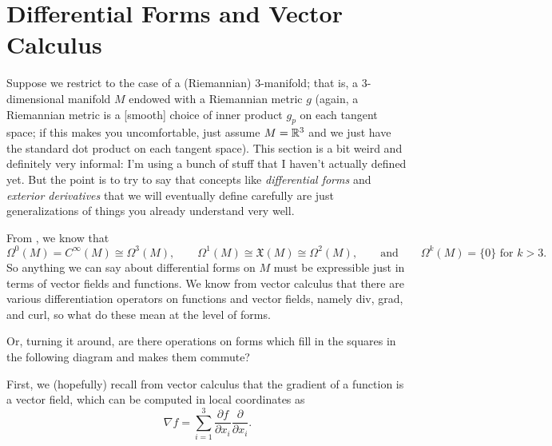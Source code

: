 
\section{Differential Forms and Vector Calculus}
\label{sec:vector calculus}

Suppose we restrict to the case of a (Riemannian) 3-manifold; that is, a 3-dimensional manifold $M$ endowed with a Riemannian metric $g$ (again, a Riemannian metric is a [smooth] choice of inner product $g_p$ on each tangent space; if this makes you uncomfortable, just assume $M = \mathbb{R}^3$ and we just have the standard dot product on each tangent space). This section is a bit weird and definitely very informal: I'm using a bunch of stuff that I haven't actually defined yet. But the point is to try to say that concepts like \emph{differential forms} and \emph{exterior derivatives} that we will eventually define carefully are just generalizations of things you already understand very well.

From , we know that
\[
	\Omega^0(M) = C^\infty(M) \cong \Omega^3(M), \qquad \Omega^1(M) \cong \mathfrak{X}(M) \cong \Omega^2(M), \qquad \text{and} \qquad \Omega^k(M) = \{0\} \text{ for } k > 3.
\]
So anything we can say about differential forms on $M$ must be expressible just in terms of vector fields and functions. We know from vector calculus that there are various differentiation operators on functions and vector fields, namely div, grad, and curl, so what do these mean at the level of forms.

Or, turning it around, are there operations on forms which fill in the squares in the following diagram and makes them commute?

\begin{center}
\end{center}

First, we (hopefully) recall from vector calculus that the gradient of a function is a vector field, which can be computed in local coordinates as
\[
	\nabla f = \sum_{i=1}^3 \frac{\partial f}{\partial x_i}\frac{\partial}{\partial x_i}.
\]

